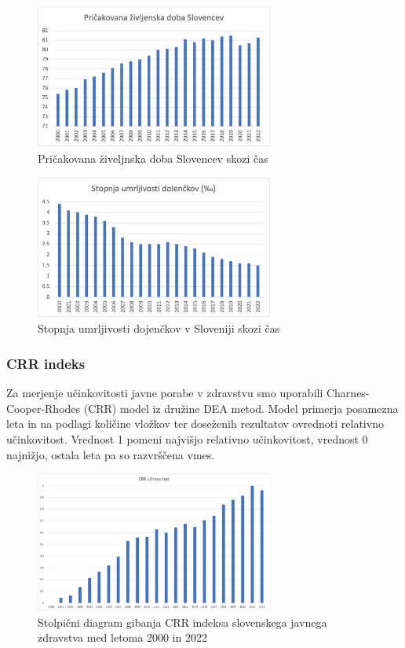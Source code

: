 \documentclass[12pt,a4paper]{article}
\theoremstyle{definition}
\begin{document}
\begin{figure}[H]
    \centering
    \includegraphics[width=0.7\textwidth]{pricak_zivlj_slo.png}
    \caption{Pričakovana živeljnska doba Slovencev skozi čas}
    \label{fig:pricak_zivlj_slo.png}
  \end{figure}

  \begin{figure}[H]
    \centering
    \includegraphics[width=0.7\textwidth]{umrljivost_doj_slo.png}
    \caption{Stopnja umrljivosti dojenčkov v Sloveniji skozi čas}
    \label{fig:umrljivost_doj_slo.png}
  \end{figure}

\subsubsection{CRR indeks}

  Za merjenje učinkovitosti javne porabe v zdravstvu smo uporabili Charnes-Cooper-Rhodes (CRR) model iz družine DEA metod. 
  Model primerja posamezna leta in na podlagi količine vložkov ter doseženih rezultatov ovrednoti relativno učinkovitost. 
  Vrednost 1 pomeni najvišjo relativno učinkovitost, vrednost 0 najnižjo, ostala leta pa so razvrščena vmes.

\begin{figure}[H]
    \centering
    \includegraphics[width=0.7\textwidth]{CRR_stolpicni_slo.png}
    \caption{Stolpični diagram gibanja CRR indeksa slovenskega javnega zdravstva med letoma 2000 in 2022}
    \label{fig:CRR_stolpicni_slo.png}
  \end{figure}
\end{document}
